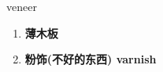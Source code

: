 
\begin{frame}
{\huge veneer}
\begin{center}
\begin{enumerate}\Large
  \item \textbf{薄木板}
  \item \textbf{粉饰(不好的东西) varnish}
\end{enumerate}
\end{center}
\end{frame}
